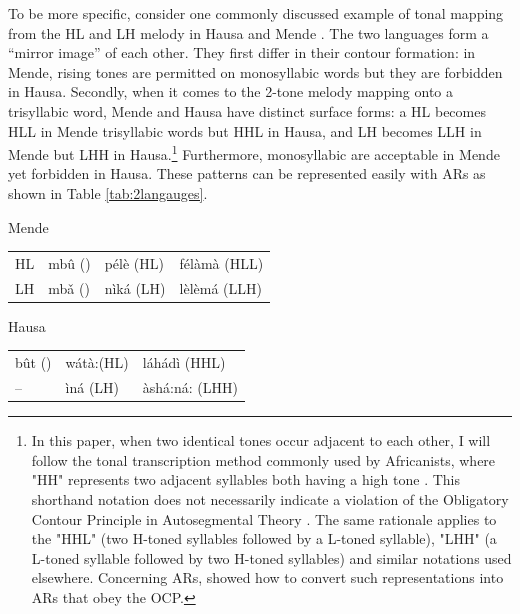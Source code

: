 \documentclass[11pt,letterpaper]{article}
\begin{document}
To be more specific, consider one commonly discussed example of tonal mapping from the HL and LH melody in Hausa and Mende \citep{jardineLocalNatureToneassociation2017, zoll2003optimal}. The two languages form a ``mirror image'' of each other. They first differ in their contour formation: in Mende, rising tones are permitted on monosyllabic words but they are forbidden in Hausa. Secondly, when it comes to the 2-tone melody mapping onto a trisyllabic word, Mende and Hausa have distinct surface forms: a HL becomes HLL in Mende trisyllabic words but HHL in Hausa, and LH becomes LLH in Mende but LHH in Hausa.\footnote{In this paper, when two identical tones occur adjacent to each other, I will follow the tonal transcription method commonly used by Africanists, where "HH" represents two adjacent syllables both having a high tone \citep{Leben, Newmanbook, zoll2003optimal}. This shorthand notation does not necessarily indicate a violation of the Obligatory Contour Principle in Autosegmental Theory \citep{goldsmith1976autosegmental}. The same rationale applies to the "HHL" (two H-toned syllables followed by a L-toned syllable), "LHH" (a L-toned syllable followed by two H-toned syllables) and similar notations used elsewhere. Concerning ARs, \citet{jardine-heinz-2015-concatenation} showed how to convert such representations into ARs that obey the OCP.} Furthermore, monosyllabic  are acceptable in Mende yet forbidden in Hausa. These patterns can be represented easily with ARs as shown in Table \ref{tab:2langauges}.
\begin{multicols}{2}
\ea  Mende\\ \noindent
\begin{tabular}{llll}
	HL & mbû (\texttoptiebar{HL}) & pélè (HL) & félàmà (HLL)  \\
	LH & mbǎ (\texttoptiebar{LH}) & nìká (LH) & lèlèmá  (LLH)
\end{tabular}
    \z
\ea Hausa\\
 \noindent
\begin{tabular}{lll}
	bût (\texttoptiebar{HL}) & wátà:(HL) & láhádì  	(HHL)  \\
	--                       & ìná 	(LH) & àshá:ná: (LHH)
\end{tabular}
\z
\end{multicols}
\end{document}
